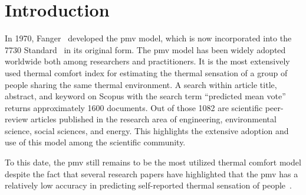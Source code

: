 \section{Introduction}\label{sec:introduction}

In 1970, Fanger~\cite{Fanger1970} developed the \ac{pmv} model, which is now incorporated into the \gls{7730} Standard~\cite{iso7730} in its original form.
The \ac{pmv} model has been widely adopted worldwide both among researchers and practitioners.
It is the most extensively used thermal comfort index for estimating the thermal sensation of a group of people sharing the same thermal environment.
A search within article title, abstract, and keyword on Scopus with the search term ``predicted mean vote'' returns approximately 1600 documents.
Out of those 1082 are scientific peer-review articles published in the research area of engineering, environmental science, social sciences, and energy.
This highlights the extensive adoption and use of this model among the scientific community.

To this date, the \ac{pmv} still remains to be the most utilized thermal comfort model despite the fact that several research papers have highlighted that the \ac{pmv} has a relatively low accuracy in predicting self-reported thermal sensation of people~\cite{Cheung2019, Yao2022, kim2019thermal, tartarini2018thermal,Humphreys2002,Doherty1988}.

